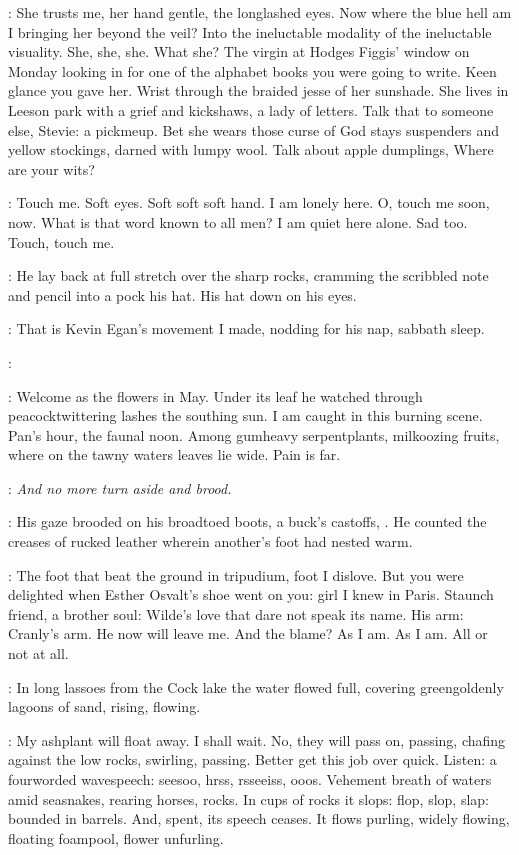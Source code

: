 \StephenInt:
She trusts me, her hand gentle, the longlashed eyes.
Now where the blue hell am I bringing her beyond the veil?
Into the ineluctable modality
of the ineluctable visuality.
She, she, she.
What she?
The virgin at Hodges Figgis' window on Monday looking in
for one of the alphabet books you were going to write.
Keen glance you gave her.
Wrist through the braided jesse of her sunshade.
She lives in Leeson park with a grief and kickshaws, a lady of letters.
Talk that to someone else,
Stevie:
a pickmeup.
Bet she wears those curse of God stays
suspenders and yellow stockings, darned with lumpy wool.
Talk about apple dumplings,
Where are your wits?

\StephenInt:
Touch me.
Soft eyes.
Soft soft soft hand.
I am lonely here.
O, touch me soon, now.
What is that word known to all men?
I am quiet here alone.
Sad too.
Touch, touch me.

:
He lay back at full stretch over the sharp rocks,
cramming the scribbled note and pencil into a pock his hat.
His hat down on his eyes.

\StephenInt:
That is Kevin Egan's movement I made,
nodding for his nap, sabbath sleep.

\kevin:

\StephenInt:
Welcome as the flowers in May.
Under its leaf he watched through peacocktwittering lashes
the southing sun.
I am caught in this burning scene.
Pan's hour, the faunal noon.
Among gumheavy serpentplants, milkoozing fruits,
where on the tawny waters leaves lie wide.
Pain is far.

\StephenInt:
\emph{And no more turn aside and brood.}

:
His gaze brooded on his broadtoed boots, a buck's castoffs, .
He counted the creases of rucked leather wherein another's foot had nested warm.

\StephenInt:
The foot that beat the ground in tripudium,
foot I dislove.
But you were delighted when Esther Osvalt's shoe went on you:
girl I knew in Paris.
Staunch friend, a brother soul:
Wilde's love that dare not speak its name.
His arm:
Cranly's arm.
He now will leave me.
And the blame?
As I am.
As I am.
All or not at all.

:
In long lassoes from the Cock lake
the water flowed full,
covering greengoldenly lagoons of sand,
rising, flowing.

\StephenInt:
My ashplant will float away.
I shall wait.
No, they will pass on, passing,
chafing against the low rocks, swirling, passing.
Better get this job over quick.
Listen:
a fourworded wavespeech:
seesoo, hrss, rsseeiss, ooos.
Vehement breath of waters
amid seasnakes, rearing horses, rocks.
In cups of rocks it slops:
flop, slop, slap:
bounded in barrels.
And, spent, its speech ceases.
It flows purling,
widely flowing,
floating foampool,
flower unfurling.

